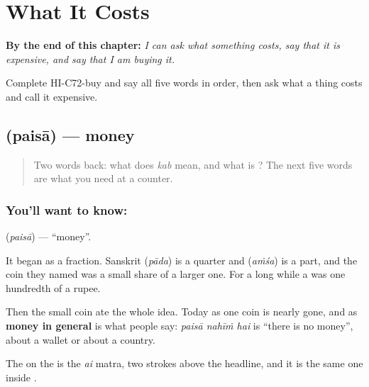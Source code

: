 
\chapter{What It Costs}
\label{ch:hi-what-it-costs}

\begin{chapteropening}
\textbf{By the end of this chapter:} \emph{I can ask what something costs, say that it is expensive, and say that I am buying it.}

Complete HI-C72-buy and say all five words in order, then ask what a thing costs and call it expensive.
\end{chapteropening}

\section[paisā]{ (paisā) — money}

\label{lesson:HI-C72-money}



\begin{quote}
Two words back: what does \emph{kab} mean, and what is \textbf{}? The next five words are what you need at a counter.
\end{quote}

\subsection*{You'll want to know: }
\textbf{} (\emph{paisā}) — \textquotedblleft{}money\textquotedblright{}.

It began as a fraction. Sanskrit  (\emph{pāda}) is a quarter and  (\emph{aṁśa}) is a part, and the coin they named was a small share of a larger one. For a long while a  was one hundredth of a rupee.

Then the small coin ate the whole idea. Today  as one coin is nearly gone, and  as \textbf{money in general} is what people say: \emph{paisā nahīṁ hai} is \textquotedblleft{}there is no money\textquotedblright{}, about a wallet or about a country.

The  on the  is the \emph{ai} matra, two strokes above the headline, and it is the same one inside \textbf{}.

